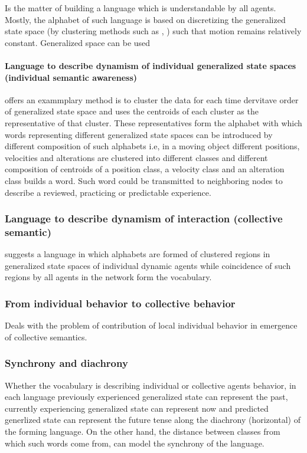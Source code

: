 \documentclass{article}
\begin{document}
			Is the matter of building a language which is understandable by all agents. Mostly, the alphabet of such language is based on discretizing the generalized state space (by clustering methods such as \cite{fiser-2013-growing-neural-gas-efficiently}, \cite{kohonen-2001-self-organizing-maps}) such that motion remains relatively constant. Generalized space can be used  
			\paragraph{Language to describe dynamism of individual generalized state spaces (individual semantic awareness)}
				\cite{kanapram-2019-self-awareness-in-intelligent-vehicles-experience-based-abnormality-detection} offers an exammplary method is to cluster the data for each time dervitave order of generalized state space and uses the centroids of each cluster as the representative of that cluster. These representatives form the alphabet with which words representing different generalized state spaces can be introduced by different composition of such alphabets i.e, in a moving object different positions, velocities and alterations are clustered into different classes and different composition of centroids of a position class, a velocity class and an alteration class builds a word. Such word could be transmitted to neighboring nodes to describe a reviewed, practicing or predictable experience.
			\subsubsection{Language to describe dynamism of interaction (collective semantic)}\label{sec:collective-semantic-awareness}
				\cite{baydoun-2019-prediction-of-multi-target-dynamics-using-discrete-descriptors-an-interactive-approach} suggests a language in which alphabets are formed of clustered regions in generalized state spaces of individual dynamic agents while coincidence of such regions by all agents in the network form the vocabulary.  
			
			\subsubsection{From individual behavior to collective behavior}
			Deals with the problem of contribution of local individual behavior in emergence of collective semantics.
			
			
			\subsubsection{Synchrony and diachrony}
				Whether the vocabulary is describing individual or collective agents behavior, in each language previously experienced generalized state can represent the  past, currently experiencing generalized state can represent now and predicted generlized state can represent the future tense along the diachrony (horizontal) of the forming language. On the other hand, the distance between classes from which such words come from, can model the synchrony of the language.
				
\end{document}
